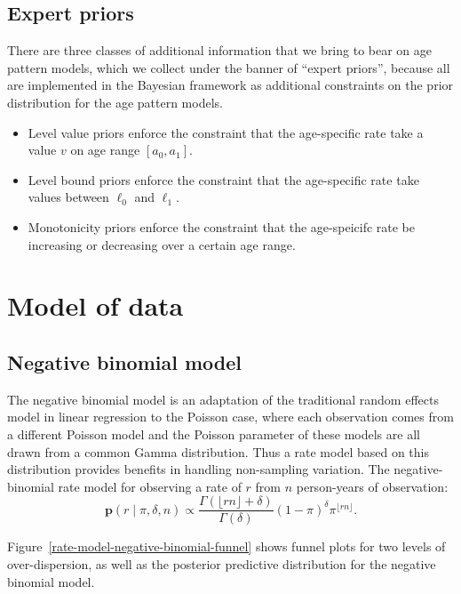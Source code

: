 \documentclass[12pt]{article}
\newcommand{\1}{\mathbf{1}}
\newcommand{\0}{\mathbf{0}}
\newcommand{\given}{\;|\;}
\newcommand{\dens}{\mathbf{p}}
\begin{document}
\subsection{Expert priors}
There are three classes of additional information that we bring to
bear on age pattern models, which we collect under the banner of
``expert priors'', because all are implemented in the Bayesian
framework as additional constraints on the prior distribution for the
age pattern models.
\begin{itemize}
\item Level value priors enforce the constraint that the age-specific
rate take a value $v$ on age range $[a_0,a_1]$.  
\item Level bound priors enforce the constraint that the age-specific rate
take values between $\ell_0$ and $\ell_1$.
\item Monotonicity priors enforce the constraint that the age-speicifc
  rate be increasing or decreasing over a certain age range.
\end{itemize}

\section{Model of data}
\label{data}
\subsection{Negative binomial model}
The negative binomial model is an adaptation of the traditional random
effects model in linear regression to the Poisson case, where each
observation comes from a different Poisson model and the Poisson
parameter of these models are all drawn from a common Gamma
distribution. Thus a rate model based on this distribution provides
benefits in handling non-sampling variation.  The negative-binomial
rate model for observing a rate of $r$ from $n$ person-years of observation:
\[
\dens(r\given \pi, \delta, n) \propto
 \frac{\Gamma(\lfloor rn \rfloor+\delta)}{\Gamma(\delta)} (1-\pi)^\delta \pi^{\lfloor rn\rfloor}.
\]

Figure~\ref{rate-model-negative-binomial-funnel} shows funnel plots
for two levels of over-dispersion, as well as the posterior predictive
distribution for the negative binomial model.
\end{document}
